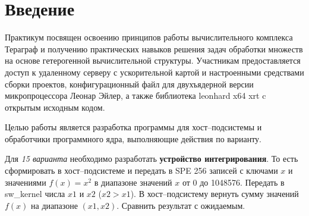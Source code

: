 \chapter{Введение}

Практикум посвящен освоению принципов работы вычислительного комплекса Тераграф и получению практических навыков решения задач обработки множеств на основе гетерогенной вычислительной структуры.
Участникам предоставляется доступ к удаленному серверу с ускорительной картой и настроенными средствами сборки проектов, конфигурационный файл для двухъядерной версии микропроцессора Леонар Эйлер, а также библиотека leonhard x64 xrt c открытым исходным кодом.

Целью работы является разработка программы для хост--подсистемы и обработчики программного ядра, выполняющие действия по варианту.

Для \textit{15 варианта} необходимо разработать \textbf{устройство интегрирования}.
То есть сформировать в хост--подсистеме и передать в SPE 256 записей с ключами $x$ и значениями $f(x)=x^2$ в диапазоне значений $x$ от 0 до 1048576. Передать в sw\_kernel числа $x1$ и $x2$ ($x2 > x1$).
В хост--подсистему вернуть сумму значений $f(x)$ на диапазоне $(x1, x2)$.
Сравнить результат с ожидаемым.